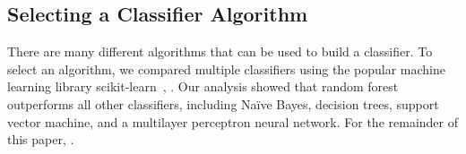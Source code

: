 \subsection{Selecting a Classifier Algorithm}

There are many different algorithms that can be used to build a classifier. To select an
algorithm, we compared multiple classifiers using the popular machine learning library scikit-learn~\cite{pedregosa11},  . Our analysis showed that random forest outperforms all other classifiers, including Na\"ive Bayes, decision trees, support vector machine, and a multilayer perceptron neural network. For the remainder of this paper, .%



